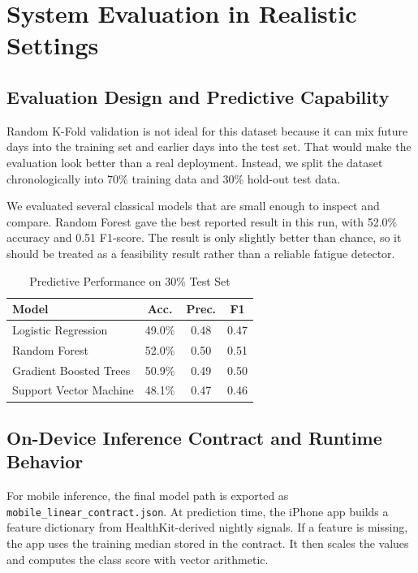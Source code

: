 \documentclass[sigconf,10pt]{acmart}
\begin{document}
\section{System Evaluation in Realistic Settings}

\subsection{Evaluation Design and Predictive Capability}
Random K-Fold validation is not ideal for this dataset because it can mix future days into the training set and earlier days into the test set. That would make the evaluation look better than a real deployment. Instead, we split the dataset chronologically into 70\% training data and 30\% hold-out test data. 

We evaluated several classical models that are small enough to inspect and compare. Random Forest gave the best reported result in this run, with 52.0\% accuracy and 0.51 F1-score. The result is only slightly better than chance, so it should be treated as a feasibility result rather than a reliable fatigue detector.

\begin{table}[t]
  \caption{Predictive Performance on 30\% Test Set}
  \label{tab:results}
  \centering
  \small
  \setlength{\tabcolsep}{4pt}
  \begin{tabular}{lccc}
    \toprule
    Model & Acc. & Prec. & F1\\
    \midrule
    Logistic Regression & 49.0\% & 0.48 & 0.47 \\
    Random Forest & 52.0\% & 0.50 & 0.51 \\
    Gradient Boosted Trees & 50.9\% & 0.49 & 0.50 \\
    Support Vector Machine & 48.1\% & 0.47 & 0.46 \\
    \bottomrule
  \end{tabular}
\end{table}

\subsection{On-Device Inference Contract and Runtime Behavior}
For mobile inference, the final model path is exported as \texttt{mobile\_linear\_contract.json}. At prediction time, the iPhone app builds a feature dictionary from HealthKit-derived nightly signals. If a feature is missing, the app uses the training median stored in the contract. It then scales the values and computes the class score with vector arithmetic.
\end{document}
